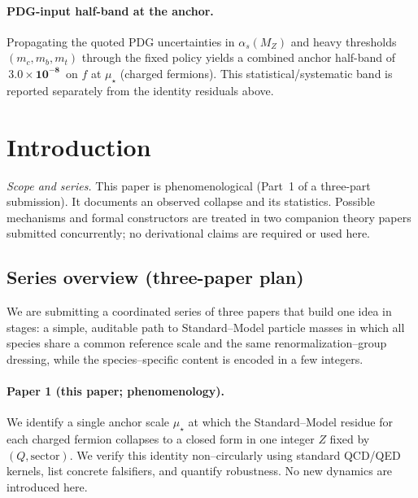 \documentclass[epjc3]{svjour3}
\begin{document}
\paragraph{PDG-input half-band at the anchor.}
Propagating the quoted PDG uncertainties in $\alpha_s(M_Z)$ and heavy thresholds $(m_c,m_b,m_t)$ through the fixed policy yields a combined anchor half-band of $\,\mathbf{3.0\times10^{-8}}\,$ on $f$ at $\mu_\star$ (charged fermions). This statistical/systematic band is reported separately from the identity residuals above.

\begin{center}
\end{center}

\section{Introduction}

\noindent\textit{Scope and series.} This paper is phenomenological (Part~1 of a three-part submission). It documents an observed collapse and its statistics. Possible mechanisms and formal constructors are treated in two companion theory papers submitted concurrently; no derivational claims are required or used here.

\subsection*{Series overview (three-paper plan)}
We are submitting a coordinated series of three papers that build one idea in stages: a simple, auditable path to Standard--Model particle masses in which all species share a common reference scale and the same renormalization--group dressing, while the species--specific content is encoded in a few integers.

\paragraph{Paper 1 (this paper; phenomenology).}
We identify a single anchor scale $\mu_\star$ at which the Standard--Model residue for each charged fermion collapses to a closed form in one integer $Z$ fixed by $(Q,\text{sector})$. We verify this identity non--circularly using standard QCD/QED kernels, list concrete falsifiers, and quantify robustness. No new dynamics are introduced here.
\end{document}
